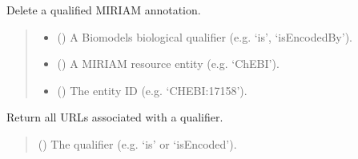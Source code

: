 \documentclass[letterpaper,12pt,english]{sphinxmanual}
\begin{document}
\begin{fulllineitems}
\begin{fulllineitems}
\label{\detokenize{api/core:cbmpy.CBCommon.MIRIAMannotation.deleteMIRIAMannotation}}
\pysigstartsignatures
\pysiglinewithargsret
{}
{\sphinxparamcomma {}\sphinxparamcomma {}}
{}
\pysigstopsignatures
\sphinxAtStartPar
Delete a qualified MIRIAM annotation.
\begin{quote}\begin{description}
\begin{itemize}
\item {} 
\sphinxAtStartPar
{} () \textendash{} A Biomodels biological qualifier (e.g. ‘is’, ‘isEncodedBy’).

\item {} 
\sphinxAtStartPar
{} () \textendash{} A MIRIAM resource entity (e.g. ‘ChEBI’).

\item {} 
\sphinxAtStartPar
{} () \textendash{} The entity ID (e.g. ‘CHEBI:17158’).

\end{itemize}

\sphinxAtStartPar
{}

\end{description}\end{quote}

\end{fulllineitems}


\begin{fulllineitems}
\label{\detokenize{api/core:cbmpy.CBCommon.MIRIAMannotation.getMIRIAMUrisForQualifier}}
\pysigstartsignatures
\pysiglinewithargsret
{}
{}
{}
\pysigstopsignatures
\sphinxAtStartPar
Return all URLs associated with a qualifier.
\begin{quote}\begin{description}
\sphinxAtStartPar
{} () \textendash{} The qualifier (e.g. ‘is’ or ‘isEncoded’).


\end{description}
\end{quote}
\end{fulllineitems}
\end{fulllineitems}
\end{document}
